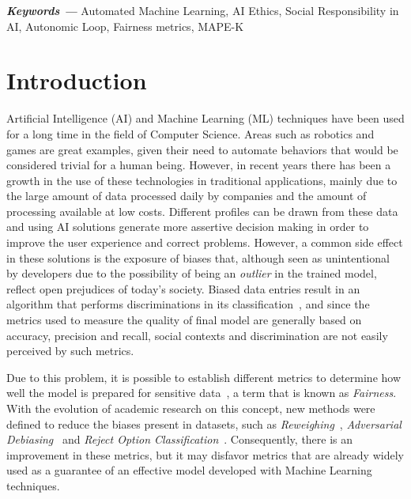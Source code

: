 \documentclass[sigconf]{acmart}
\providecommand{\keywords}[1]
{
  \small	
  \textbf{\textit{Keywords ---}} #1
}
\begin{document}

\keywords{Automated Machine Learning, AI Ethics, Social Responsibility in AI, Autonomic Loop, Fairness metrics, MAPE-K}

\maketitle

\section{Introduction}

Artificial Intelligence (AI) and Machine Learning (ML) techniques have been used for a long time in the field of Computer Science. Areas such as robotics and games are great examples, given their need to automate behaviors that would be considered trivial for a human being. However, in recent years there has been a growth in the use of these technologies in traditional applications, mainly due to the large amount of data processed daily by companies and the amount of processing available at low costs. Different profiles can be drawn from these data and using AI solutions generate more assertive decision making in order to improve the user experience and correct problems. However, a common side effect in these solutions is the exposure of biases that, although seen as unintentional by developers due to the possibility of being an \textit{outlier} in the trained model, reflect open prejudices of today's society. Biased data entries result in an algorithm that performs discriminations in its classification~\citep{Buolamwini_2018}, and since the metrics used to measure the quality of final model are generally based on accuracy, precision and recall, social contexts and discrimination are not easily perceived by such metrics.

Due to this problem, it is possible to establish different metrics to determine how well the model is prepared for sensitive data~\citep{Begley_2021}, a term that is known as \textit{Fairness}. With the evolution of academic research on this concept, new methods were defined to reduce the biases present in datasets, such as \textit{Reweighing}~\citep{Kamiran_2011}, \textit{Adversarial Debiasing}~\citep{Zhang_2018} and \textit {Reject Option Classification}~\citep{Kamiran_2012}. Consequently, there is an improvement in these metrics, but it may disfavor metrics that are already widely used as a guarantee of an effective model developed with Machine Learning techniques.
\end{document}
